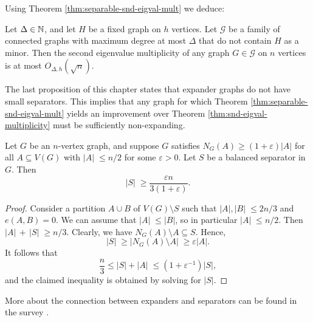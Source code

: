 Using Theorem \ref{thm:separable-snd-eigval-mult} we deduce:
\begin{corollary}
    Let $\Delta \in \mathbb{N}$, and let $H$ be a fixed graph on $h$ vertices. 
    Let $\mathcal G$ be a family of connected graphs with maximum degree at most $\Delta$ that do not contain $H$ as a minor. 
    Then the second eigenvalue multiplicity of any graph $G \in \mathcal G$ on $n$ vertices is at most $O_{\Delta, h}(\sqrt{n})$.
\end{corollary}

The last proposition of this chapter states that expander graphs do not have small separators.
This implies that any graph for which Theorem \ref{thm:separable-snd-eigval-mult} yields an improvement over Theorem \ref{thm:snd-eigval-multiplicity} must be sufficiently non-expanding.

\begin{proposition}
    Let $G$ be an $n$-vertex graph, and suppose $G$ satisfies $N_G(A) \ge (1 + \varepsilon) |A|$ for all $A \subseteq V(G)$ with $|A|\; \le n/2$ for some $\varepsilon > 0$.
    Let $S$ be a balanced separator in $G$. 
    Then 
    \begin{equation*}
        |S| \; \ge \frac{\varepsilon n}{3(1 + \varepsilon )}.
    \end{equation*}
\end{proposition}

\begin{proof}
    Consider a partition $A \cup B$ of $V(G) \setminus S$ such that $|A|, |B|\; \le 2n/3$ \mbox{and $e(A, B) = 0$}.
    We can assume that $|A|\; \le |B|$, so in particular $|A|\; \le n/2$.
    Then $|A|\, +\, |S|\; \ge n/3$.
    Clearly, we have $N_G(A) \setminus A \subseteq S$. 
    Hence, 
    \begin{equation*}
        |S|\; \ge |N_G(A) \setminus A|\; \ge \varepsilon |A|.
    \end{equation*}
    It follows that 
    \begin{equation*}
        \frac{n}{3} \le |S| + |A|\; \le (1 + \varepsilon^{-1}) |S|,
    \end{equation*}
    and the claimed inequality is obtained by solving for $|S|$.
\end{proof}

More about the connection between expanders and separators can be found in the survey \cite{krivelevich}.